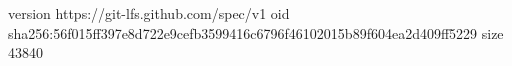 version https://git-lfs.github.com/spec/v1
oid sha256:56f015ff397e8d722e9cefb3599416c6796f46102015b89f604ea2d409ff5229
size 43840

